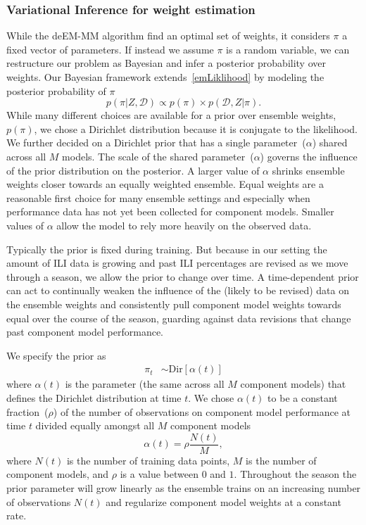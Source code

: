 \documentclass[sagev,times,Review,10pt]{sagej}
\def\l{\left}
\def\r{\right}
\newcommand{\f}{\frac}
\begin{document}
 
\subsubsection{Variational Inference for weight estimation}

While the deEM-MM algorithm find an optimal set of weights, it considers $\pi$ a fixed vector of parameters.
If instead we assume $\pi$ is a random variable, we can restructure our problem as Bayesian and infer a posterior probability over weights.
Our Bayesian framework extends~\eqref{emLiklihood} by modeling the posterior probability of $\pi$
\begin{equation}
  p(\pi | Z, \mathcal{D}) \propto p(\pi) \times p(\mathcal{D},Z | \pi).
\end{equation}
While many different choices are available for a prior over ensemble weights, $p(\pi)$, we chose a Dirichlet distribution because it is conjugate to the likelihood.
We further decided on a Dirichlet prior that has a single parameter~($\alpha$) shared across all $M$ models. 
The scale of the shared parameter~($\alpha$) governs the influence of the prior distribution on the posterior.
A larger value of $\alpha$ shrinks ensemble weights closer towards an equally weighted ensemble.
Equal weights are a reasonable first choice for many ensemble settings and especially when performance data has not yet been collected for component models.
Smaller values of $\alpha$ allow the model to rely more heavily on the observed data. 

Typically the prior is fixed during training. 
But because in our setting the amount of ILI data is growing and past ILI percentages are revised as we move through a season, we allow the prior to change over time.
A time-dependent prior can act to continually weaken the influence of the (likely to be revised) data on the ensemble weights and consistently pull component model weights towards equal over the course of the season, guarding against data revisions that change past component model performance.

We specify the prior as 
\begin{align*}
    \pi_{t} &\sim \text{Dir} \l[\alpha(t)\r]
\end{align*}
where $\alpha(t)$ is the parameter (the same across all $M$ component models) that defines the Dirichlet distribution at time $t$.
We chose $\alpha(t)$ to be a constant fraction~($\rho$) of the number of observations on component model performance at time $t$ divided equally amongst all $M$ component models
\begin{equation}
  \alpha(t) = \rho \f{N(t)}{M},
\end{equation}
where $N(t)$ is the number of training data points, $M$ is the number of component models, and $\rho$ is a value between $0$ and $1$.
Throughout the season the prior parameter will grow linearly as the ensemble trains on an increasing number of observations $N(t)$ and regularize component model weights at a constant rate.
\end{document}
